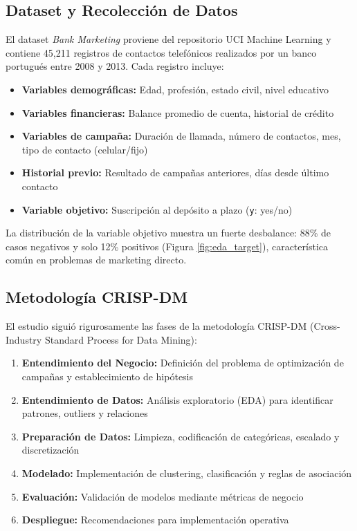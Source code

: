 \documentclass[12pt,letterpaper]{article}
\begin{document}
\subsection{Dataset y Recolección de Datos}

El dataset \textit{Bank Marketing} \cite{moro2014} proviene del repositorio UCI Machine Learning y contiene 45,211 registros de contactos telefónicos realizados por un banco portugués entre 2008 y 2013. Cada registro incluye:

\begin{itemize}
    \item \textbf{Variables demográficas:} Edad, profesión, estado civil, nivel educativo
    \item \textbf{Variables financieras:} Balance promedio de cuenta, historial de crédito
    \item \textbf{Variables de campaña:} Duración de llamada, número de contactos, mes, tipo de contacto (celular/fijo)
    \item \textbf{Historial previo:} Resultado de campañas anteriores, días desde último contacto
    \item \textbf{Variable objetivo:} Suscripción al depósito a plazo (\texttt{y}: yes/no)
\end{itemize}

La distribución de la variable objetivo muestra un fuerte desbalance: 88\% de casos negativos y solo 12\% positivos (Figura \ref{fig:eda_target}), característica común en problemas de marketing directo.

\subsection{Metodología CRISP-DM}

El estudio siguió rigurosamente las fases de la metodología CRISP-DM (Cross-Industry Standard Process for Data Mining):

\begin{enumerate}
    \item \textbf{Entendimiento del Negocio:} Definición del problema de optimización de campañas y establecimiento de hipótesis
    \item \textbf{Entendimiento de Datos:} Análisis exploratorio (EDA) para identificar patrones, outliers y relaciones
    \item \textbf{Preparación de Datos:} Limpieza, codificación de categóricas, escalado y discretización
    \item \textbf{Modelado:} Implementación de clustering, clasificación y reglas de asociación
    \item \textbf{Evaluación:} Validación de modelos mediante métricas de negocio
    \item \textbf{Despliegue:} Recomendaciones para implementación operativa
\end{enumerate}
\end{document}
